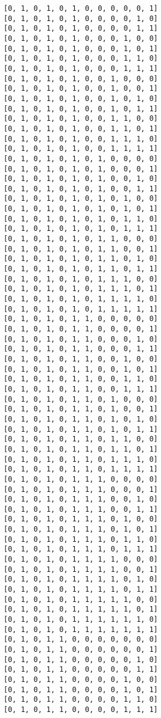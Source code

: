 \documentclass[11pt]{article}
\begin{document}
\begin{Verbatim}[commandchars=\\\{\}]
[0, 1, 0, 1, 0, 1, 0, 0, 0, 0, 0, 1]
[0, 1, 0, 1, 0, 1, 0, 0, 0, 0, 1, 0]
[0, 1, 0, 1, 0, 1, 0, 0, 0, 0, 1, 1]
[0, 1, 0, 1, 0, 1, 0, 0, 0, 1, 0, 0]
[0, 1, 0, 1, 0, 1, 0, 0, 0, 1, 0, 1]
[0, 1, 0, 1, 0, 1, 0, 0, 0, 1, 1, 0]
[0, 1, 0, 1, 0, 1, 0, 0, 0, 1, 1, 1]
[0, 1, 0, 1, 0, 1, 0, 0, 1, 0, 0, 0]
[0, 1, 0, 1, 0, 1, 0, 0, 1, 0, 0, 1]
[0, 1, 0, 1, 0, 1, 0, 0, 1, 0, 1, 0]
[0, 1, 0, 1, 0, 1, 0, 0, 1, 0, 1, 1]
[0, 1, 0, 1, 0, 1, 0, 0, 1, 1, 0, 0]
[0, 1, 0, 1, 0, 1, 0, 0, 1, 1, 0, 1]
[0, 1, 0, 1, 0, 1, 0, 0, 1, 1, 1, 0]
[0, 1, 0, 1, 0, 1, 0, 0, 1, 1, 1, 1]
[0, 1, 0, 1, 0, 1, 0, 1, 0, 0, 0, 0]
[0, 1, 0, 1, 0, 1, 0, 1, 0, 0, 0, 1]
[0, 1, 0, 1, 0, 1, 0, 1, 0, 0, 1, 0]
[0, 1, 0, 1, 0, 1, 0, 1, 0, 0, 1, 1]
[0, 1, 0, 1, 0, 1, 0, 1, 0, 1, 0, 0]
[0, 1, 0, 1, 0, 1, 0, 1, 0, 1, 0, 1]
[0, 1, 0, 1, 0, 1, 0, 1, 0, 1, 1, 0]
[0, 1, 0, 1, 0, 1, 0, 1, 0, 1, 1, 1]
[0, 1, 0, 1, 0, 1, 0, 1, 1, 0, 0, 0]
[0, 1, 0, 1, 0, 1, 0, 1, 1, 0, 0, 1]
[0, 1, 0, 1, 0, 1, 0, 1, 1, 0, 1, 0]
[0, 1, 0, 1, 0, 1, 0, 1, 1, 0, 1, 1]
[0, 1, 0, 1, 0, 1, 0, 1, 1, 1, 0, 0]
[0, 1, 0, 1, 0, 1, 0, 1, 1, 1, 0, 1]
[0, 1, 0, 1, 0, 1, 0, 1, 1, 1, 1, 0]
[0, 1, 0, 1, 0, 1, 0, 1, 1, 1, 1, 1]
[0, 1, 0, 1, 0, 1, 1, 0, 0, 0, 0, 0]
[0, 1, 0, 1, 0, 1, 1, 0, 0, 0, 0, 1]
[0, 1, 0, 1, 0, 1, 1, 0, 0, 0, 1, 0]
[0, 1, 0, 1, 0, 1, 1, 0, 0, 0, 1, 1]
[0, 1, 0, 1, 0, 1, 1, 0, 0, 1, 0, 0]
[0, 1, 0, 1, 0, 1, 1, 0, 0, 1, 0, 1]
[0, 1, 0, 1, 0, 1, 1, 0, 0, 1, 1, 0]
[0, 1, 0, 1, 0, 1, 1, 0, 0, 1, 1, 1]
[0, 1, 0, 1, 0, 1, 1, 0, 1, 0, 0, 0]
[0, 1, 0, 1, 0, 1, 1, 0, 1, 0, 0, 1]
[0, 1, 0, 1, 0, 1, 1, 0, 1, 0, 1, 0]
[0, 1, 0, 1, 0, 1, 1, 0, 1, 0, 1, 1]
[0, 1, 0, 1, 0, 1, 1, 0, 1, 1, 0, 0]
[0, 1, 0, 1, 0, 1, 1, 0, 1, 1, 0, 1]
[0, 1, 0, 1, 0, 1, 1, 0, 1, 1, 1, 0]
[0, 1, 0, 1, 0, 1, 1, 0, 1, 1, 1, 1]
[0, 1, 0, 1, 0, 1, 1, 1, 0, 0, 0, 0]
[0, 1, 0, 1, 0, 1, 1, 1, 0, 0, 0, 1]
[0, 1, 0, 1, 0, 1, 1, 1, 0, 0, 1, 0]
[0, 1, 0, 1, 0, 1, 1, 1, 0, 0, 1, 1]
[0, 1, 0, 1, 0, 1, 1, 1, 0, 1, 0, 0]
[0, 1, 0, 1, 0, 1, 1, 1, 0, 1, 0, 1]
[0, 1, 0, 1, 0, 1, 1, 1, 0, 1, 1, 0]
[0, 1, 0, 1, 0, 1, 1, 1, 0, 1, 1, 1]
[0, 1, 0, 1, 0, 1, 1, 1, 1, 0, 0, 0]
[0, 1, 0, 1, 0, 1, 1, 1, 1, 0, 0, 1]
[0, 1, 0, 1, 0, 1, 1, 1, 1, 0, 1, 0]
[0, 1, 0, 1, 0, 1, 1, 1, 1, 0, 1, 1]
[0, 1, 0, 1, 0, 1, 1, 1, 1, 1, 0, 0]
[0, 1, 0, 1, 0, 1, 1, 1, 1, 1, 0, 1]
[0, 1, 0, 1, 0, 1, 1, 1, 1, 1, 1, 0]
[0, 1, 0, 1, 0, 1, 1, 1, 1, 1, 1, 1]
[0, 1, 0, 1, 1, 0, 0, 0, 0, 0, 0, 0]
[0, 1, 0, 1, 1, 0, 0, 0, 0, 0, 0, 1]
[0, 1, 0, 1, 1, 0, 0, 0, 0, 0, 1, 0]
[0, 1, 0, 1, 1, 0, 0, 0, 0, 0, 1, 1]
[0, 1, 0, 1, 1, 0, 0, 0, 0, 1, 0, 0]
[0, 1, 0, 1, 1, 0, 0, 0, 0, 1, 0, 1]
[0, 1, 0, 1, 1, 0, 0, 0, 0, 1, 1, 0]
[0, 1, 0, 1, 1, 0, 0, 0, 0, 1, 1, 1]

\end{Verbatim}
\end{document}
